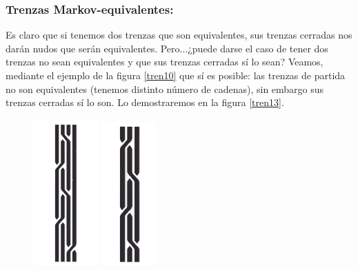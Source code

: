 \documentclass[14pt]{extarticle}
\begin{document}
\newpage
\begin{center}
	\subsubsection{Trenzas Markov-equivalentes:}
\end{center}
Es claro que si tenemos dos trenzas que son equivalentes, sus trenzas cerradas nos darán nudos que serán equivalentes. Pero...¿puede darse el caso de tener dos trenzas no sean equivalentes y que sus trenzas cerradas sí lo sean? Veamos, mediante el ejemplo de la figura \ref{tren10} que sí es posible: las trenzas de partida no son equivalentes (tenemos distinto número de cadenas), sin embargo sus trenzas cerradas sí lo son. Lo demostraremos en la figura \ref{tren13}.\\
\begin{figure}[h!]
	\centering
	\includegraphics[width=2.5cm]{itrenzas/t1pro.png}
	\includegraphics[width=2.1cm]{itrenzas/t2pro.png}
	

\end{figure}
\end{document}
